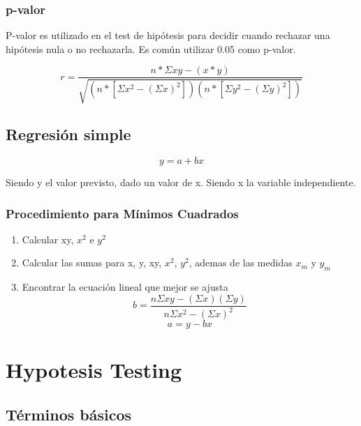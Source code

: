 \documentclass[]{article}
\begin{document}
\subsubsection{p-valor}

P-valor es utilizado en el test de hipótesis para decidir cuando rechazar una hipótesis nula o no rechazarla. Es común utilizar 0.05 como p-valor. 

\begin{equation}
r = \frac{n*\Sigma xy - (x*y)}{\sqrt{(n*[\Sigma x^2- (\Sigma x)^2])(n*[\Sigma y^2- (\Sigma y)^2])}}
\end{equation}

\subsection{Regresión simple}

\begin{equation}
y = a + bx
\end{equation}

Siendo y el valor previsto, dado un valor de x. Siendo x la variable independiente.

\subsubsection{Procedimiento para Mínimos Cuadrados}

\begin{enumerate}
	\item Calcular xy, $x^2$ e $y^2$
	\item Calcular las sumas para x, y, xy, $x^2$, $y^2$, ademas de las medidas $x_m$ y $y_m$
	\item Encontrar la ecuación lineal que mejor se ajusta 
	\begin{equation}
	b = \frac{n \Sigma xy - (\Sigma x)(\Sigma y)}{n \Sigma x^2 - (\Sigma x)^2}
	\end{equation}
	\begin{equation}
		a = y - bx 
	\end{equation}
\end{enumerate}

\section{Hypotesis Testing}

\subsection{Términos básicos}
\end{document}

